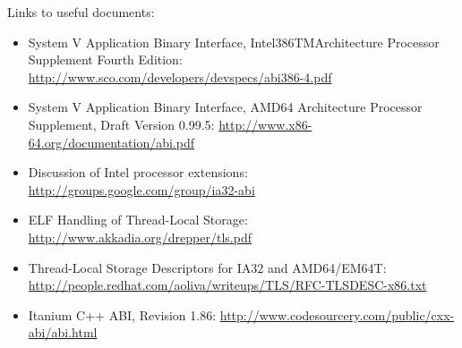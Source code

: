 Links to useful documents:
\begin{itemize}
 \item System V Application Binary Interface, Intel386TMArchitecture
       Processor Supplement Fourth Edition:
       \url{http://www.sco.com/developers/devspecs/abi386-4.pdf}
 \item System V Application Binary Interface, AMD64 Architecture Processor
       Supplement, Draft Version 0.99.5:
       \url{http://www.x86-64.org/documentation/abi.pdf}
 \item Discussion of Intel processor extensions:
       \url{http://groups.google.com/group/ia32-abi}
 \item ELF Handling of Thread-Local Storage:
       \url{http://www.akkadia.org/drepper/tls.pdf}
 \item Thread-Local Storage Descriptors for IA32 and AMD64/EM64T:
       \url{http://people.redhat.com/aoliva/writeups/TLS/RFC-TLSDESC-x86.txt}
 \item Itanium C++ ABI, Revision 1.86:
       \url{http://www.codesourcery.com/public/cxx-abi/abi.html}
\end{itemize}

